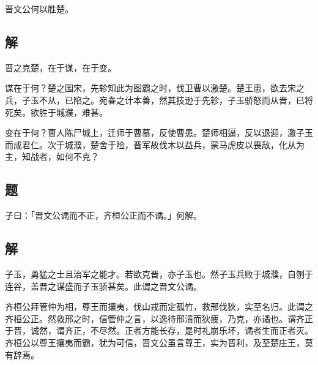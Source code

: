 \documentclass{article}
\begin{document}
晋文公何以胜楚。

\subsection*{解}

晋之克楚，在于谋，在于变。

谋在于何？楚之围宋，先轸知此为图霸之时，伐卫曹以激楚。楚王患，欲去宋之兵，子玉不从，已陷之。宛春之计本善，然其技逊于先轸，子玉骄怒而从晋，已将死矣。欲胜于城濮，难甚。

变在于何？曹人陈尸城上，迁师于曹墓，反使曹患。楚师相逼，反以退迎，激子玉而成君仁。次于城濮，楚舍于险，晋军故伐木以益兵，蒙马虎皮以畏敌，化从为主，知战者，如何不克？

\subsection*{题}

子曰：「晋文公谲而不正，齐桓公正而不谲。」何解。

\subsection*{解}

子玉，勇猛之士且治军之能才。若欲克晋，亦子玉也。然子玉兵败于城濮，自刎于连谷，盖晋之谋盛而子玉骄甚矣。此谓之晋文公谲。

齐桓公拜管仲为相，尊王而攘夷，伐山戎而定孤竹，救邢伐狄，实至名归。此谓之齐桓公正。然救邢之时，信管仲之言，以逸待邢溃而狄疲，乃克，亦谲也。谓齐正于晋，诚然，谓齐正，不尽然。正者方能长存，是时礼崩乐坏，谲者生而正者灭。齐桓公以尊王攘夷而霸，犹为可信，晋文公虽言尊王，实为晋利，及至楚庄王，莫有辞焉。
\end{document}
